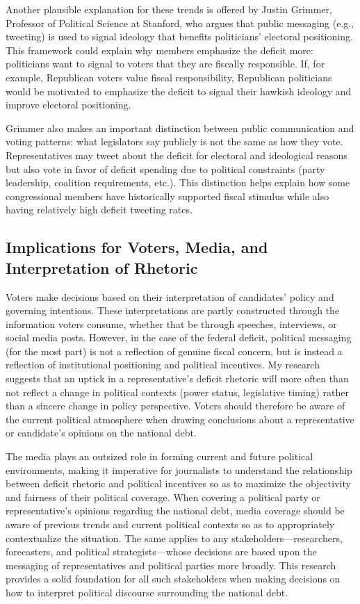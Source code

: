\documentclass[
  12pt,
]{article}
\begin{document}
Another plausible explanation for these trends is offered by Justin
Grimmer, Professor of Political Science at Stanford, who argues that
public messaging (e.g., tweeting) is used to signal ideology that
benefits politicians' electoral positioning. This framework could
explain why members emphasize the deficit more: politicians want to
signal to voters that they are fiscally responsible. If, for example,
Republican voters value fiscal responsibility, Republican politicians
would be motivated to emphasize the deficit to signal their hawkish
ideology and improve electoral positioning.

Grimmer also makes an important distinction between public communication
and voting patterns: what legislators say publicly is not the same as
how they vote. Representatives may tweet about the deficit for electoral
and ideological reasons but also vote in favor of deficit spending due
to political constraints (party leadership, coalition requirements,
etc.). This distinction helps explain how some congressional members
have historically supported fiscal stimulus while also having relatively
high deficit tweeting rates.

\subsection{Implications for Voters, Media, and Interpretation of
Rhetoric}\label{implications-for-voters-media-and-interpretation-of-rhetoric}

Voters make decisions based on their interpretation of candidates'
policy and governing intentions. These interpretations are partly
constructed through the information voters consume, whether that be
through speeches, interviews, or social media posts. However, in the
case of the federal deficit, political messaging (for the most part) is
not a reflection of genuine fiscal concern, but is instead a reflection
of institutional positioning and political incentives. My research
suggests that an uptick in a representative's deficit rhetoric will more
often than not reflect a change in political contexts (power status,
legislative timing) rather than a sincere change in policy perspective.
Voters should therefore be aware of the current political atmosphere
when drawing conclusions about a representative or candidate's opinions
on the national debt.

The media plays an outsized role in forming current and future political
environments, making it imperative for journalists to understand the
relationship between deficit rhetoric and political incentives so as to
maximize the objectivity and fairness of their political coverage. When
covering a political party or representative's opinions regarding the
national debt, media coverage should be aware of previous trends and
current political contexts so as to appropriately contextualize the
situation. The same applies to any stakeholders---researchers,
forecasters, and political strategists---whose decisions are based upon
the messaging of representatives and political parties more broadly.
This research provides a solid foundation for all such stakeholders when
making decisions on how to interpret political discourse surrounding the
national debt.
\end{document}
